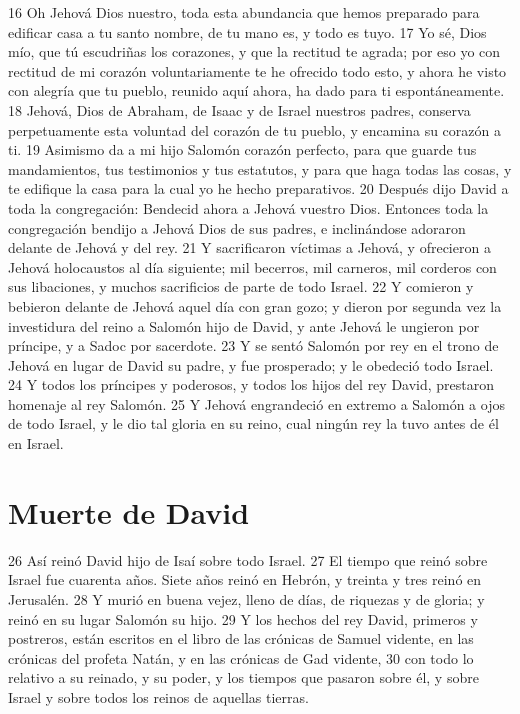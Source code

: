 16 Oh Jehová Dios nuestro, toda esta abundancia que hemos preparado para edificar casa a tu santo nombre, de tu mano es, y todo es tuyo.
17 Yo sé, Dios mío, que tú escudriñas los corazones, y que la rectitud te agrada; por eso yo con rectitud de mi corazón voluntariamente te he ofrecido todo esto, y ahora he visto con alegría que tu pueblo, reunido aquí ahora, ha dado para ti espontáneamente.
18 Jehová, Dios de Abraham, de Isaac y de Israel nuestros padres, conserva perpetuamente esta voluntad del corazón de tu pueblo, y encamina su corazón a ti.
19 Asimismo da a mi hijo Salomón corazón perfecto, para que guarde tus mandamientos, tus testimonios y tus estatutos, y para que haga todas las cosas, y te edifique la casa para la cual yo he hecho preparativos.
20 Después dijo David a toda la congregación: Bendecid ahora a Jehová vuestro Dios. Entonces toda la congregación bendijo a Jehová Dios de sus padres, e inclinándose adoraron delante de Jehová y del rey.
21 Y sacrificaron víctimas a Jehová, y ofrecieron a Jehová holocaustos al día siguiente; mil becerros, mil carneros, mil corderos con sus libaciones, y muchos sacrificios de parte de todo Israel.
22 Y comieron y bebieron delante de Jehová aquel día con gran gozo; y dieron por segunda vez la investidura del reino a Salomón hijo de David, y ante Jehová le ungieron por príncipe, y a Sadoc por sacerdote.
23 Y se sentó Salomón por rey en el trono de Jehová en lugar de David su padre, y fue prosperado; y le obedeció todo Israel.
24 Y todos los príncipes y poderosos, y todos los hijos del rey David, prestaron homenaje al rey Salomón.
25 Y Jehová engrandeció en extremo a Salomón a ojos de todo Israel, y le dio tal gloria en su reino, cual ningún rey la tuvo antes de él en Israel.

\section*{Muerte de David}

26 Así reinó David hijo de Isaí sobre todo Israel.
27 El tiempo que reinó sobre Israel fue cuarenta años. Siete años reinó en Hebrón, y treinta y tres reinó en Jerusalén. 
28 Y murió en buena vejez, lleno de días, de riquezas y de gloria; y reinó en su lugar Salomón su hijo.
29 Y los hechos del rey David, primeros y postreros, están escritos en el libro de las crónicas de Samuel vidente, en las crónicas del profeta Natán, y en las crónicas de Gad vidente,
30 con todo lo relativo a su reinado, y su poder, y los tiempos que pasaron sobre él, y sobre Israel y sobre todos los reinos de aquellas tierras.


